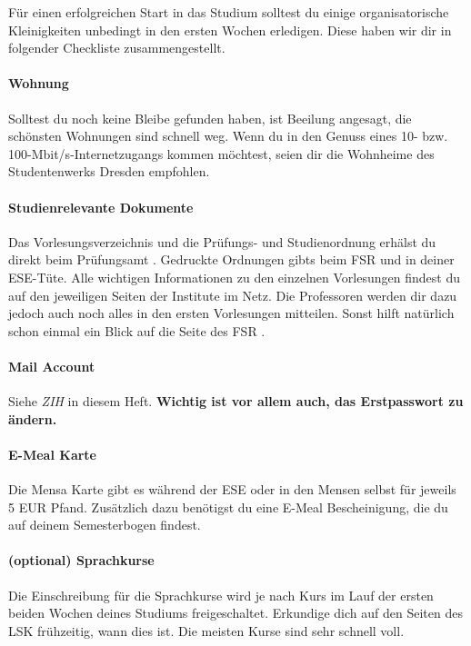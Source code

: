 
Für einen erfolgreichen Start in das Studium solltest du einige organisatorische Kleinigkeiten unbedingt in den ersten Wochen erledigen.
Diese haben wir dir in folgender Checkliste zusammengestellt.


\paragraph{Wohnung}
Solltest du noch keine Bleibe gefunden haben, ist Beeilung angesagt, die schönsten Wohnungen sind schnell weg.
Wenn du in den Genuss eines 10- bzw. 100-Mbit/s-Internetzugangs kommen möchtest, seien dir die Wohnheime \link{\textcolor{red}{NONE}} des Studentenwerks Dresden empfohlen.

\paragraph{Studienrelevante Dokumente}
Das Vorlesungsverzeichnis und die Prüfungs- und Studienordnung erhälst du direkt beim Prüfungsamt \link{\textcolor{red}{NONE}}.
Gedruckte Ordnungen gibts beim FSR und in deiner ESE-Tüte.
Alle wichtigen Informationen zu den einzelnen Vorlesungen findest du auf den jeweiligen Seiten der Institute im Netz.
Die Professoren werden dir dazu jedoch auch noch alles in den ersten Vorlesungen mitteilen. Sonst hilft natürlich schon einmal ein Blick auf die Seite des FSR \link{\textcolor{red}{NONE}}.

\paragraph{Mail Account}
Siehe \textit{ZIH} in diesem Heft.
\textbf{Wichtig ist vor allem auch, das Erstpasswort zu ändern.}

\paragraph{E-Meal Karte}
Die Mensa Karte gibt es während der ESE oder in den Mensen selbst für jeweils 5 EUR Pfand.
Zusätzlich dazu benötigst du eine E-Meal Bescheinigung, die du auf deinem Semesterbogen findest.

\paragraph{(optional) Sprachkurse}
Die Einschreibung für die Sprachkurse wird je nach Kurs im Lauf der ersten beiden Wochen deines Studiums freigeschaltet.
Erkundige dich auf den Seiten des LSK \link{\textcolor{red}{NONE}} frühzeitig, wann dies ist. Die meisten Kurse sind sehr schnell voll.

